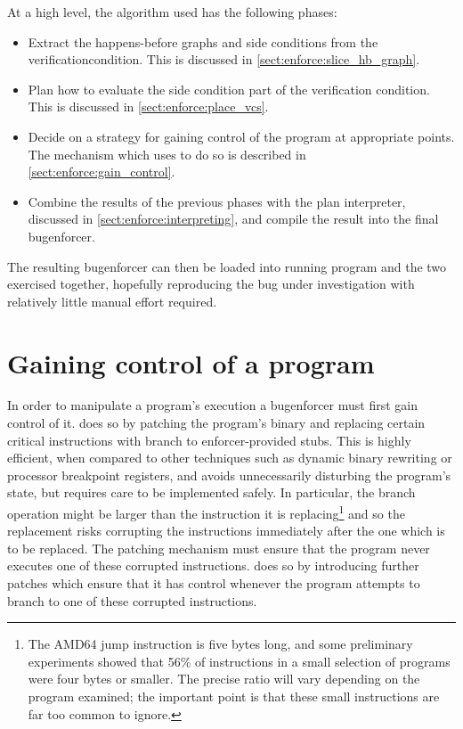 At a high level, the algorithm used has the following phases:
\begin{itemize}
\item
  Extract the happens-before graphs and side conditions from the
  \gls{verificationcondition}.  This is discussed in
  \autoref{sect:enforce:slice_hb_graph}.
\item
  Plan how to evaluate the side condition part of the verification
  condition.  This is discussed in \autoref{sect:enforce:place_vcs}.
\item
  Decide on a strategy for gaining control of the program at
  appropriate points.  The mechanism which {\technique} uses to do so
  is described in \autoref{sect:enforce:gain_control}.
\item
  Combine the results of the previous phases with the plan
  interpreter, discussed in \autoref{sect:enforce:interpreting}, and
  compile the result into the final \gls{bugenforcer}.
\end{itemize}
The resulting \gls{bugenforcer} can then be loaded into running
program and the two exercised together, hopefully reproducing the bug
under investigation with relatively little manual effort required.

\section{Gaining control of a program}
\label{sect:enforce:gain_control}

In order to manipulate a program's execution a \gls{bugenforcer} must
first gain control of it.  {\Implementation} does so by patching the
program's binary and replacing certain critical instructions with
branch to enforcer-provided stubs.  This is highly efficient, when
compared to other techniques such as dynamic binary
rewriting\needCite{} or processor breakpoint registers\needCite{}, and
avoids unnecessarily disturbing the program's state, but requires care
to be implemented safely.  In particular, the branch operation might
be larger than the instruction it is replacing\footnote{The AMD64 jump
  instruction is five bytes long, and some preliminary experiments
  showed that 56\% of instructions in a small selection of programs
  were four bytes or smaller.  The precise ratio will vary depending
  on the program examined; the important point is that these small
  instructions are far too common to ignore.} and so the replacement
risks corrupting the instructions immediately after the one which is
to be replaced.  The patching mechanism must ensure that the program
never executes one of these corrupted instructions.  {\Implementation}
does so by introducing further patches which ensure that it has
control whenever the program attempts to branch to one of these
corrupted instructions.


